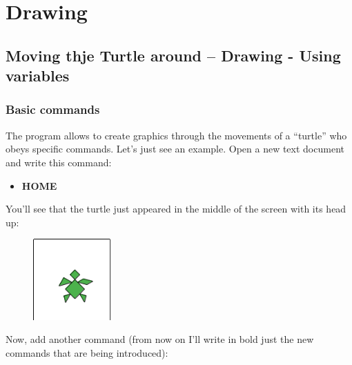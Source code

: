 \chapter{Drawing} \label{cap:disegnare}

\section{Moving thje Turtle around – Drawing - Using variables}

\subsection{Basic commands} \label{sec:comandi-fondamentali}

The program allows to create graphics through the movements of a “turtle” who obeys specific commands. Let's just see an example.
Open a new text document and write this command:
\vskip 1cm

\begin{scriptsize}
\begin{minipage}{01.0\textwidth}
\begin{itemize}[itemsep=-3pt,parsep=2pt]
\item[] \hspace{0.5cm} \textbf{HOME} 
\end{itemize}
\end{minipage}
\end{scriptsize}

\vskip 1cm

You'll see that the turtle just appeared in the middle of the screen with its head up:

\begin{figure}[H]
   \centering
   \includegraphics[width=3.0cm,trim=4 4 8 4,clip]{./images/disegnare/disegnare-1.png}
   \label{dis-1}
\end{figure}

Now, add another command (from now on I'll write in bold just the new commands that are being introduced):

